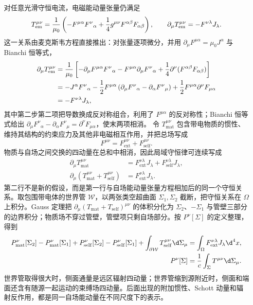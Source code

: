 对任意光滑守恒电流，电磁能动量张量仍满足
\begin{equation*}
 T_{\mathrm{em}}^{\mu\nu}
 ={1\over\mu_0}
 \left(
 -F^{\mu\alpha}F^\nu{}_{\alpha}
 +{1\over4}g^{\mu\nu}F^{\alpha\beta}F_{\alpha\beta}
 \right),
 \qquad
 \partial_\mu T_{\mathrm{em}}^{\mu\nu}
 =-F^{\nu\lambda}J_\lambda.
\end{equation*}
这一关系由麦克斯韦方程直接推出：对张量逐项微分，并用 $\partial_\mu F^{\mu\alpha}=\mu_0J^\alpha$ 与 Bianchi 恒等式，
\begin{align*}
 \partial_\mu T_{\mathrm{em}}^{\mu\nu}
 &={1\over\mu_0}\left[-\partial_\mu F^{\mu\alpha}F^\nu{}_\alpha
 -F^{\mu\alpha}\partial_\mu F^\nu{}_\alpha
 +{1\over4}\partial^\nu(F^{\alpha\beta}F_{\alpha\beta})\right]\\
 &=-J^\alpha F^\nu{}_\alpha
 -{1\over2}F^{\mu\alpha}\left(\partial_\mu F^\nu{}_\alpha
 -\partial_\alpha F^\nu{}_\mu\right)
 +{1\over2}F^{\mu\alpha}\partial^\nu F_{\mu\alpha}\\
 &=-F^{\nu\lambda}J_\lambda,
\end{align*}
其中第二步第二项把导数换成反对称组合，利用了 $F^{\mu\alpha}$ 的反对称性；Bianchi 恒等式给出 $\partial_\mu F^\nu{}_\alpha-\partial_\alpha F^\nu{}_\mu=\partial^\nu F_{\mu\alpha}$，使末两项相消。
令 $T_{\mathrm{mat}}^{\mu\nu}$ 包含带电物质的惯性、维持其结构的约束应力及其他非电磁相互作用，并把总场写成
\begin{equation*}
 F^{\mu\nu}=F_{\mathrm{ext}}^{\mu\nu}+F_{\mathrm{self}}^{\mu\nu}.
\end{equation*}
物质与自场之间交换的四动量在总和中相消，因此局域守恒律可连续写成
\begin{align*}
 \partial_\mu T_{\mathrm{mat}}^{\mu\nu}
 &=F_{\mathrm{ext}}^{\nu\lambda}J_\lambda
   +F_{\mathrm{self}}^{\nu\lambda}J_\lambda,\\
 \partial_\mu
 \left(T_{\mathrm{mat}}^{\mu\nu}+T_{\mathrm{self}}^{\mu\nu}\right)
 &=F_{\mathrm{ext}}^{\nu\lambda}J_\lambda.
\end{align*}
第二行不是新的假设，而是第一行与自场能动量张量方程相加后的同一个守恒关系。取包围带电体的世界管 $\mathcal W$，以两张类空超曲面 $\Sigma_1,\Sigma_2$ 截断，把守恒关系在 $\Omega$ 上积分。Gauss 定理把 $\partial_\mu(T_{\mathrm{mat}}+T_{\mathrm{self}})^{\mu\nu}$ 的体积分化为 $\Sigma_2$、$-\Sigma_1$ 与管壁三部分的边界积分；物质场不穿过管壁，管壁项只剩自场部分。按 $P^\nu[\Sigma]$ 的定义整理，得到
\begin{align*}
 P_{\mathrm{mat}}^\nu[\Sigma_2]-P_{\mathrm{mat}}^\nu[\Sigma_1]
 +P_{\mathrm{self}}^\nu[\Sigma_2]-P_{\mathrm{self}}^\nu[\Sigma_1]
 +\int_{\partial\mathcal W}T_{\mathrm{self}}^{\mu\nu}\d\Sigma_\mu
 &=\int_\Omega F_{\mathrm{ext}}^{\nu\lambda}J_\lambda\d^4x,\\
 P^\nu[\Sigma]&={1\over c}\int_\Sigma T^{\mu\nu}\d\Sigma_\mu.
\end{align*}
世界管取得很大时，侧面通量是远区辐射四动量；世界管缩到源附近时，侧面和端面还含有随源一起运动的束缚场四动量。后面出现的附加惯性、Schott 动量和辐射反作用，都是同一自场能动量在不同尺度下的表示。

